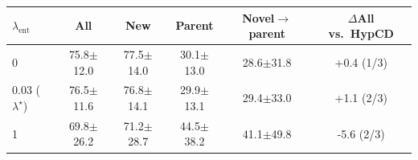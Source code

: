 \begin{tabular}{lccccc}
\toprule
$\lambda_{\mathrm{ent}}$ & All & New & Parent & Novel$\to$parent & $\Delta$All vs.\ HypCD \\
\midrule
0 & 75.8{\scriptsize$\pm$12.0} & 77.5{\scriptsize$\pm$14.0} & 30.1{\scriptsize$\pm$13.0} & 28.6{\scriptsize$\pm$31.8} & +0.4 (1/3) \\
0.03 ($\lambda^\star$) & 76.5{\scriptsize$\pm$11.6} & 76.8{\scriptsize$\pm$14.1} & 29.9{\scriptsize$\pm$13.1} & 29.4{\scriptsize$\pm$33.0} & +1.1 (2/3) \\
1 & 69.8{\scriptsize$\pm$26.2} & 71.2{\scriptsize$\pm$28.7} & 44.5{\scriptsize$\pm$38.2} & 41.1{\scriptsize$\pm$49.8} & -5.6 (2/3) \\
\bottomrule
\end{tabular}
